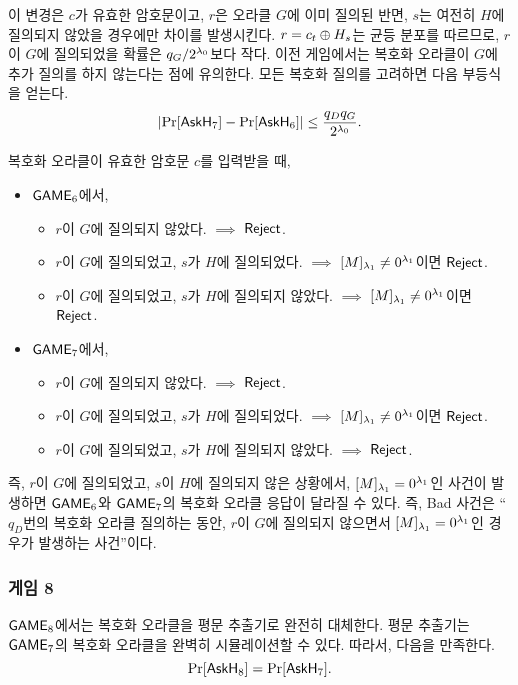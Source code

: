 이 변경은 $c$가 유효한 암호문이고, $r$은 오라클 $G$에 이미 질의된 반면, $s$는
여전히 $H$에 질의되지 않았을 경우에만 차이를 발생시킨다. $r = c_t \oplus H_s$는
균등 분포를 따르므로, $r$이 $G$에 질의되었을 확률은 $q_G / 2^{\lambda_0}$보다 작다.
이전 게임에서는 복호화 오라클이 $G$에 추가 질의를 하지 않는다는 점에 유의한다.
모든 복호화 질의를 고려하면 다음 부등식을 얻는다.
$$
	\left| \Pr[\textsf{AskH}_7] - \Pr[\textsf{AskH}_6] \right| \leq \frac{q_D q_G}{2^{\lambda_0}}.
$$

\begin{memo}
	복호화 오라클이 유효한 암호문 $c$를 입력받을 때, 
	\begin{itemize}
		\item $\textsf{GAME}_6$에서,
			\begin{itemize}
				\item $r$이 $G$에 질의되지 않았다. $\implies$ $\textsf{Reject}$.
				\item $r$이 $G$에 질의되었고, $s$가 $H$에 질의되었다. $\implies$ $[M]_{\lambda_1} \neq 0^{\lambda_1}$이면 $\textsf{Reject}$.
				\item $r$이 $G$에 질의되었고, $s$가 $H$에 질의되지 않았다. $\implies$ $[M]_{\lambda_1} \neq 0^{\lambda_1}$이면 $\textsf{Reject}$.
			\end{itemize}
		\item $\textsf{GAME}_7$에서,
		\begin{itemize}
			\item $r$이 $G$에 질의되지 않았다. $\implies$ $\textsf{Reject}$.
			\item $r$이 $G$에 질의되었고, $s$가 $H$에 질의되었다. $\implies$ $[M]_{\lambda_1} \neq 0^{\lambda_1}$이면 $\textsf{Reject}$.
			\item $r$이 $G$에 질의되었고, $s$가 $H$에 질의되지 않았다. $\implies$ $\textsf{Reject}$.
		\end{itemize}
	\end{itemize}
	즉, $r$이 $G$에 질의되었고, $s$이 $H$에 질의되지 않은 상황에서, $[M]_{\lambda_1}
	= 0^{\lambda_1}$인 사건이 발생하면 $\textsf{GAME}_6$와 $\textsf{GAME}_7$의 복호화 오라클 응답이
	달라질 수 있다. 즉, Bad 사건은 ``$q_D$번의 복호화 오라클 질의하는 동안,
	$r$이 $G$에 질의되지 않으면서 $[M]_{\lambda_1} = 0^{\lambda_1}$인 경우가 발생하는
	사건''이다.
\end{memo}


\newpage
\subsubsection{게임 8}

$\textsf{GAME}_8$에서는 복호화 오라클을 평문 추출기로 완전히 대체한다. 평문 추출기는
$\textsf{GAME}_7$의 복호화 오라클을 완벽히 시뮬레이션할 수 있다. 따라서, 다음을
만족한다.
$$
	\Pr[\textsf{AskH}_8] = \Pr[\textsf{AskH}_7].
$$

